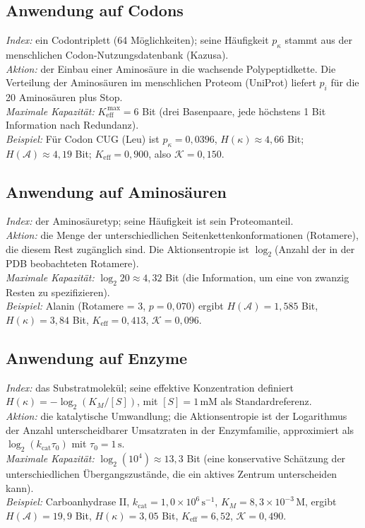 \documentclass[12pt,a4paper]{article}
\newcommand{\REL}{\mathcal{K}}          %
\newcommand{\ABS}{K_{\mathrm{eff}}}     %
\begin{document}
	\subsection{Anwendung auf Codons}
	\textit{Index:} ein Codontriplett (64 Möglichkeiten); seine Häufigkeit \(p_\kappa\) stammt aus der menschlichen Codon-Nutzungsdatenbank (Kazusa). \\
	\textit{Aktion:} der Einbau einer Aminosäure in die wachsende Polypeptidkette. Die Verteilung der Aminosäuren im menschlichen Proteom (UniProt) liefert \(p_i\) für die 20 Aminosäuren plus Stop. \\
	\textit{Maximale Kapazität:} \(\ABS^{\,\max}=6\) Bit (drei Basenpaare, jede höchstens 1 Bit Information nach Redundanz). \\
	\textit{Beispiel:} Für Codon CUG (Leu) ist \(p_\kappa=0,0396\), \(H(\kappa)\approx4,66\) Bit; \(H(\mathcal{A})\approx4,19\) Bit; \(\ABS=0,900\), also \(\REL=0,150\).
	
	\subsection{Anwendung auf Aminosäuren}
	\textit{Index:} der Aminosäuretyp; seine Häufigkeit ist sein Proteomanteil. \\
	\textit{Aktion:} die Menge der unterschiedlichen Seitenkettenkonformationen (Rotamere), die diesem Rest zugänglich sind. Die Aktionsentropie ist \(\log_2\)(Anzahl der in der PDB beobachteten Rotamere). \\
	\textit{Maximale Kapazität:} \(\log_2 20 \approx 4,32\) Bit (die Information, um eine von zwanzig Resten zu spezifizieren). \\
	\textit{Beispiel:} Alanin (Rotamere = 3, \(p=0,070\)) ergibt \(H(\mathcal{A})=1,585\) Bit, \(H(\kappa)=3,84\) Bit, \(\ABS=0,413\), \(\REL=0,096\).
	
	\subsection{Anwendung auf Enzyme}
	\textit{Index:} das Substratmolekül; seine effektive Konzentration definiert \(H(\kappa) = -\log_2(K_M/[S])\), mit \([S]=1\,\text{mM}\) als Standardreferenz. \\
	\textit{Aktion:} die katalytische Umwandlung; die Aktionsentropie ist der Logarithmus der Anzahl unterscheidbarer Umsatzraten in der Enzymfamilie, approximiert als \(\log_2(k_{\mathrm{cat}}\tau_0)\) mit \(\tau_0=1\,\text{s}\). \\
	\textit{Maximale Kapazität:} \(\log_2(10^4)\approx13,3\) Bit (eine konservative Schätzung der unterschiedlichen Übergangszustände, die ein aktives Zentrum unterscheiden kann). \\
	\textit{Beispiel:} Carboanhydrase II, \(k_{\mathrm{cat}}=1,0\times10^6\,\text{s}^{-1}\), \(K_M=8,3\times10^{-3}\,\text{M}\), ergibt \(H(\mathcal{A})=19,9\) Bit, \(H(\kappa)=3,05\) Bit, \(\ABS=6,52\), \(\REL=0,490\).
	
\end{document}
